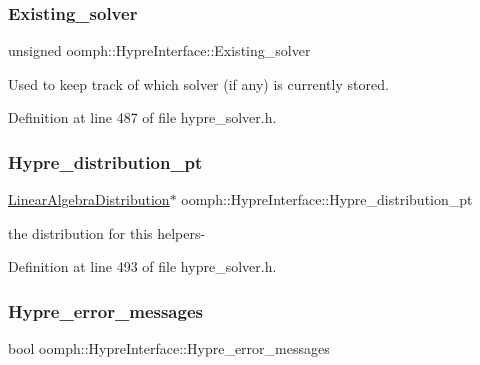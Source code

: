 \subsubsection{\texorpdfstring{Existing\+\_\+solver}{Existing\_solver}}
{\footnotesize\ttfamily unsigned oomph\+::\+Hypre\+Interface\+::\+Existing\+\_\+solver\hspace{0.3cm}{\ttfamily [private]}}



Used to keep track of which solver (if any) is currently stored. 



Definition at line 487 of file hypre\+\_\+solver.\+h.

\mbox{\label{classoomph_1_1HypreInterface_a30dce43f55e1f40d6f5e3ec48130a127}} 
\subsubsection{\texorpdfstring{Hypre\+\_\+distribution\+\_\+pt}{Hypre\_distribution\_pt}}
{\footnotesize\ttfamily \hyperlink{classoomph_1_1LinearAlgebraDistribution}{Linear\+Algebra\+Distribution}$\ast$ oomph\+::\+Hypre\+Interface\+::\+Hypre\+\_\+distribution\+\_\+pt\hspace{0.3cm}{\ttfamily [private]}}



the distribution for this helpers-\/ 



Definition at line 493 of file hypre\+\_\+solver.\+h.

\mbox{\label{classoomph_1_1HypreInterface_aa0570d52546893f0767060c6efcd4090}} 
\subsubsection{\texorpdfstring{Hypre\+\_\+error\+\_\+messages}{Hypre\_error\_messages}}
{\footnotesize\ttfamily bool oomph\+::\+Hypre\+Interface\+::\+Hypre\+\_\+error\+\_\+messages\hspace{0.3cm}{\ttfamily [protected]}}



